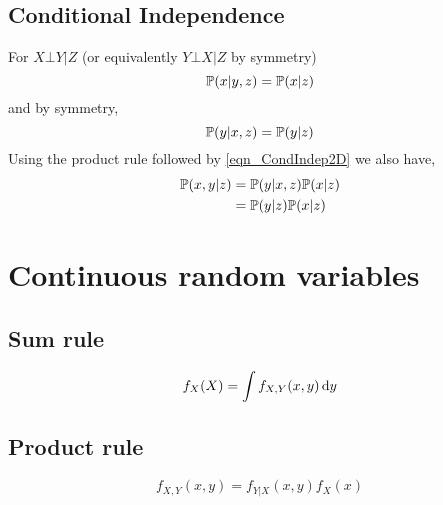 \subsection{Conditional Independence}

For $X \bot Y | Z$ (or equivalently $Y \bot X | Z$ by symmetry)
\begin{equation} \label{eqn_CondIndep1D}
\mathbb{P}(x|y,z) = \mathbb{P}(x|z)
\end{equation}
and by symmetry,
\begin{equation} \label{eqn_CondIndep2D}
\mathbb{P}(y|x,z) = \mathbb{P}(y|z)
\end{equation}
Using the product rule followed by \ref{eqn_CondIndep2D} we also have,
\begin{align}
\mathbb{P}(x,y|z)       & = \mathbb{P}(y|x,z)\mathbb{P}(x|z) \nonumber \\
                   & = \mathbb{P}(y|z)\mathbb{P}(x|z)   \label{eqn_CondIndep3D}
\end{align}

\section{Continuous random variables}

\subsection{Sum rule}

\begin{equation} \label{eqn_SumRuleC}
f_{X}(X) = \int f_{X,Y}(x,y) \, \mathrm{d} y
\end{equation}

\subsection{Product rule}

\begin{equation} \label{eqn_ProductRuleC}
f_{X,Y}(x,y) = f_{Y|X}(x,y) f_X(x)
\end{equation}

